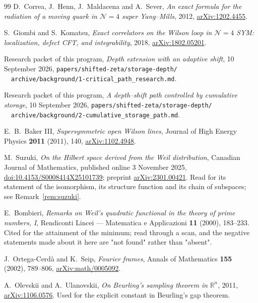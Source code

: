 \begin{thebibliography}{99}
D.~Correa, J.~Henn, J.~Maldacena and A.~Sever, \emph{An exact formula for the
radiation of a moving quark in $\mathcal N=4$ super Yang--Mills}, 2012,
\href{https://arxiv.org/abs/1202.4455}{arXiv:1202.4455}.

S.~Giombi and S.~Komatsu, \emph{Exact correlators on the Wilson loop in
$\mathcal N=4$ SYM: localization, defect CFT, and integrability}, 2018,
\href{https://arxiv.org/abs/1802.05201}{arXiv:1802.05201}.

Research packet of this program, \emph{Depth extension with an adaptive shift},
10 September 2026,
\texttt{papers/shifted-zeta/storage-depth/}\\
\texttt{\ \ archive/background/1-critical\_path\_research.md}.

Research packet of this program, \emph{A depth--shift path controlled by
cumulative storage}, 10 September 2026,
\texttt{papers/shifted-zeta/storage-depth/}\\
\texttt{\ \ archive/background/2-cumulative\_storage\_path.md}.

E.~B.~Baker III, \emph{Supersymmetric open Wilson lines}, Journal of High Energy
Physics \textbf{2011} (2011), 140,
\href{https://arxiv.org/abs/1102.4948}{arXiv:1102.4948}.

M.~Suzuki, \emph{On the Hilbert space derived from the Weil distribution},
Canadian Journal of Mathematics, published online 3 November 2025,
\href{https://doi.org/10.4153/S0008414X25101739}{doi:10.4153/S0008414X25101739};
preprint \href{https://arxiv.org/abs/2301.00421}{arXiv:2301.00421}. Read for its
statement of the isomorphism, its structure function and its chain of subspaces;
see Remark~\ref{rem:suzuki}.

E.~Bombieri, \emph{Remarks on Weil's quadratic functional in the theory of prime
numbers, I}, Rendiconti Lincei --- Matematica e Applicazioni \textbf{11} (2000),
183--233. Cited for the attainment of the minimum; read through a scan, and the
negative statements made about it here are "not found" rather than "absent".

J.~Ortega-Cerd\`a and K.~Seip, \emph{Fourier frames}, Annals of Mathematics
\textbf{155} (2002), 789--806,
\href{https://arxiv.org/abs/math/0005092}{arXiv:math/0005092}.

A.~Olevskii and A.~Ulanovskii, \emph{On Beurling's sampling theorem in
$\mathbb R^n$}, 2011, \href{https://arxiv.org/abs/1106.0576}{arXiv:1106.0576}.
Used for the explicit constant in Beurling's gap theorem.


\end{thebibliography}

